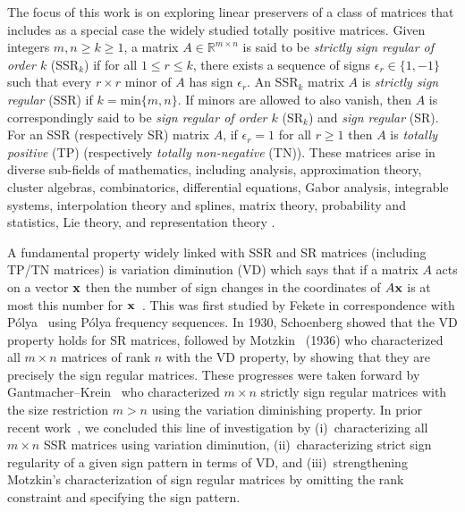 \documentclass[11pt,reqno]{amsart}
\theoremstyle{plain}
\theoremstyle{definition}
\numberwithin{equation}{section}
\begin{document}
The focus of this work is on exploring linear preservers of a class of matrices that includes as a special case the widely studied totally
positive matrices. Given integers $m,n\geq k\geq1$, a matrix $A \in \mathbb{R}^{m\times n}$ is said to be \textit{strictly sign regular of order $k$} (SSR$_k$) if for all $1 \leq r \leq k$, there exists a sequence of signs $\epsilon_r\in\{1,-1\}$ such that every $r\times r$ minor of $A$ has sign $\epsilon_r$. An SSR$_k$ matrix $A$ is \textit{strictly sign regular} (SSR) if $k=\mathrm{min}\{m,n\}$. If minors are allowed to also vanish, then $A$ is correspondingly said to be \textit{sign regular of order $k$} (SR$_k$) and \textit{sign regular} (SR). For an SSR (respectively SR) matrix $A$, if $\epsilon_r=1$ for all $r\geq1$ then $A$ is \textit{totally positive} (TP) (respectively \textit{totally non-negative} (TN)). These matrices arise in diverse sub-fields of mathematics, including analysis, approximation theory, cluster algebras, combinatorics, differential equations, Gabor analysis, integrable systems, interpolation theory and splines, matrix theory, probability and statistics, Lie theory, and representation theory \cite{Ando87,BGKP20,Bre95,fallat-john,FZ02,gantmacher-krein,GRS18,Karlin64,K68,Karlinsplines,KW14,Lu94,pinkus,Ri03,S55,Whitney}.

A fundamental property widely linked with SSR and SR matrices (including TP/TN matrices) is variation diminution (VD) which says that if a matrix $A$ acts on a vector ${\bf x}$ then the number of sign changes in the coordinates of $A{\bf x}$ is at most this
number for ${\bf x}$~\cite{BJM81,C22,S30}. This was first studied by Fekete in correspondence with P\'{o}lya~\cite{FP12} using P\'{o}lya frequency sequences. In 1930, Schoenberg showed that the VD property holds for SR matrices, followed by Motzkin~\cite{Mot36} (1936) who characterized all $m \times n$ matrices of rank $n$ with the VD property, by showing that they are precisely the sign regular matrices. These progresses were taken forward by Gantmacher--Krein~\cite{GK50} who characterized $m \times n$ strictly sign regular matrices with the size restriction $m>n$ using the variation diminishing property. In prior recent work~\cite{CY-VDP23}, we concluded this line of investigation by (i)~characterizing all $m \times n$ SSR matrices using variation diminution, (ii)~characterizing strict sign regularity of a given sign pattern in terms of VD, and (iii)~strengthening Motzkin's characterization of sign regular matrices by omitting the rank constraint and specifying the sign pattern.
\end{document}
